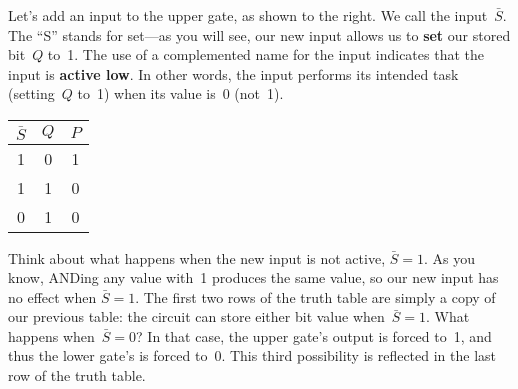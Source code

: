 \begin{minipage}{2.8in}
Let's add an input to the upper gate, as shown to the 
right.  We call the input~$\bar{S}$.  The ``S'' stands for set---as
you will see, our new input allows us to {\bf set} our stored bit~$Q$ to~1.
The use of a complemented name for the input indicates that the input
is {\bf active low}.  In other words, the input performs its intended 
task (setting~$Q$ to~1) when its value is~0 (not~1).
\end{minipage}\hspace{.25in}%
\begin{minipage}{2.1in}
\vspace{12pt}
\end{minipage}\hspace{.5in}%
\begin{minipage}{0.85in}
\begin{tabular}{c|cc}
$\bar{S}$& $Q$& $P$\\ \hline
1& 0& 1\\
1& 1& 0\\
0& 1& 0
\end{tabular}\vspace{12pt}
\end{minipage}

Think about what happens when the new input is not active, 
$\bar{S}=1$.  As you know, ANDing any value with~1 produces the 
same value, 
so our new input has no effect when $\bar{S}=1$.  The first two
rows of the truth table are simply a copy of our previous table: the 
circuit can store either bit value when~$\bar{S}=1$.
What happens when~$\bar{S}=0$?  In that case, the upper gate's
output is forced to~1, and thus the lower gate's is forced to~0.
This third possibility is reflected in the last row of the truth table.\vspace{4pt}

